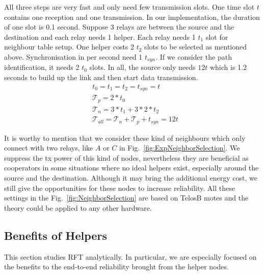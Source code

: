 \documentclass[conference]{IEEEtran}
\begin{document}
All three steps are very fast and only need few transmission slots. One time slot $t$ contains one reception and one transmission. In our implementation, the duration of one slot is 0.1 second. Suppose 3 relays are between the source and the destination and each relay needs 1 helper. Each relay needs 1 $t_1$ slot for neighbour table setup. One helper costs 2 $t_2$ slots to be selected as mentioned above. Synchronisation in per second need 1 $t_{syn}$. If we consider the path identification, it needs 2 $t_0$ slots. In all, the source only needs $12t$ which is 1.2 seconds to build up the link and then start data transmission.
\begin{equation}
\begin{aligned}
&t_0 = t_1 = t_2 = t_{syn} = t \\
&\mathcal{T}_p = 2 * t_0 \\
&\mathcal{T}_n = 3 * t_1 + 3 * 2 * t_2 \\
&\mathcal{T}_{all} = \mathcal{T}_n + \mathcal{T}_p + t_{syn} = 12 t
\end{aligned}
\end{equation}

It is worthy to mention that we consider these kind of neighbours which only connect with two relays, like $A$ or $C$ in Fig.~\ref{fig:ExpNeighborSelection}. We suppress the tx power of this kind of nodes, nevertheless they are beneficial as cooperators in some situations where no ideal helpers exist, especially around the source and the destination.  Although it may bring the additional energy cost, we still give the opportunities for these nodes to increase reliability. All these settings in the Fig.~\ref{fig:NeighborSelection} are based on TelosB motes and the theory could be applied to any other hardware. 

\subsection{Benefits of Helpers}
\label{theoreticalanalysis}
This section studies RFT analytically. In particular, we are especially focused on the benefits to the end-to-end reliability brought from the helper nodes.
\end{document}
